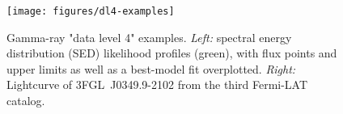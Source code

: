 \begin{figure}[tb]
\centerline{\texttt{[image: figures/dl4-examples]}}
\caption{
Gamma-ray "data level 4" examples. \emph{Left:} spectral energy distribution (SED) likelihood profiles (green), with flux points and upper limits as well
as a best-model fit overplotted. \emph{Right:} Lightcurve of 3FGL~J0349.9-2102 from the third Fermi-LAT catalog.
}
\label{fig:dl4-examples}
\end{figure}

